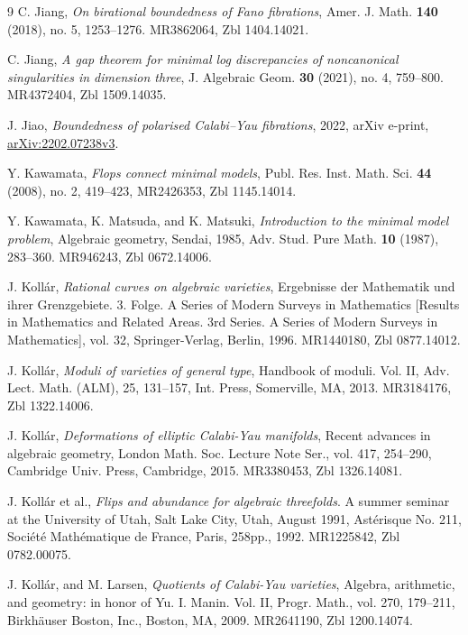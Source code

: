 \documentclass[11pt]{ip-journal}
\theoremstyle{definition}
\begin{document}
\begin{thebibliography}{9}
C. Jiang, 
\emph{On birational boundedness of {F}ano fibrations},
Amer. J. Math.
\textbf{140}
(2018),
no. 5,
1253--1276.
MR3862064,
Zbl 1404.14021.

C. Jiang, 
\emph{A gap theorem for minimal log discrepancies of noncanonical singularities in dimension three},
J. Algebraic Geom.
\textbf{30}
(2021),
no. 4,
759--800.
MR4372404,
Zbl 1509.14035.

J. Jiao, 
\emph{Boundedness of polarised {C}alabi--{Y}au fibrations},
2022,
arXiv e-print, \href{https://arxiv.org/abs/2202.07238}{arXiv:2202.07238v3}.

Y. Kawamata, 
\emph{Flops connect minimal models},
Publ. Res. Inst. Math. Sci.
\textbf{44}
(2008),
no. 2,
419--423,
MR2426353,	
Zbl 1145.14014.

Y. Kawamata, 
K. Matsuda, 
and K. Matsuki, 
\emph{Introduction to the minimal model problem},
Algebraic geometry, 
Sendai, 
1985,
Adv. Stud. Pure Math.
\textbf{10}
(1987),
283--360.
MR946243,
Zbl 0672.14006.

J. Koll\'{a}r,
\emph{Rational curves on algebraic varieties},
Ergebnisse der Mathematik und ihrer Grenzgebiete. 
3. Folge. 
A Series of Modern Surveys in Mathematics 
[Results in Mathematics and Related Areas. 
3rd Series. 
A Series of Modern Surveys in Mathematics],
vol. 32,
Springer-Verlag, 
Berlin, 
1996.
MR1440180,
Zbl 0877.14012.

J. Koll\'{a}r,
\emph{Moduli of varieties of general type},
Handbook of moduli. Vol. II,
Adv. Lect. Math. (ALM),
25,
131--157,
Int. Press, 
Somerville, 
MA, 
2013.
MR3184176,
Zbl 1322.14006.

J. Koll\'{a}r,
\emph{Deformations of elliptic {C}alabi-{Y}au manifolds},
Recent advances in algebraic geometry,
London Math. Soc. Lecture Note Ser.,
vol. 417,
254--290,
Cambridge Univ. Press, Cambridge,
2015.
MR3380453,
Zbl 1326.14081.

J. Koll\'ar et al.,
\emph{Flips and abundance for algebraic threefolds}. 
A summer seminar at the University of Utah, Salt Lake City, Utah, August 1991,
Ast\'{e}risque No. 211, 
Soci\'{e}t\'{e} Math\'{e}matique de France, 
Paris,
258pp.,
1992.
MR1225842,
Zbl 0782.00075.

J. Koll\'ar, 
and M. Larsen, 
\emph{Quotients of {C}alabi-{Y}au varieties},
{Algebra, arithmetic, and geometry: in honor of {Y}u. {I}. {M}anin. {V}ol. {II}},
Progr. Math.,
vol. 270,
179--211,
Birkh\"{a}user Boston, Inc., Boston, MA,
2009.
MR2641190,
Zbl 1200.14074.


\end{thebibliography}
\end{document}
